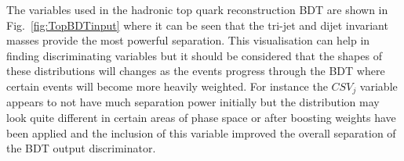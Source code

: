 
The variables used in the hadronic top quark reconstruction BDT are shown in Fig.~\ref{fig:TopBDTinput} where it can be seen that the tri-jet and dijet invariant masses provide the most powerful separation. This visualisation can help in finding discriminating variables but it should be considered that the shapes of these distributions will changes as the events progress through the BDT where certain events will become more heavily weighted. For instance the $CSV_{j}$ variable appears to not have much separation power initially but the distribution may look quite different in certain areas of phase space or after boosting weights have been applied and the inclusion of this variable improved the overall separation of the BDT output discriminator.

